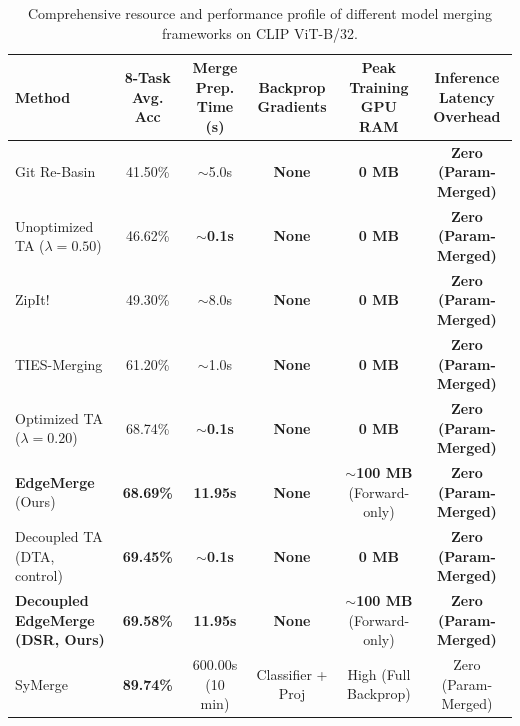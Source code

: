 \begin{table}[t]
\caption{Comprehensive resource and performance profile of different model merging frameworks on CLIP ViT-B/32.}
\label{tab:resource_profile}
\vskip 0.15in
\begin{center}
\begin{small}
\begin{sc}
\begin{tabular}{lccccc}
\toprule
Method & 8-Task Avg. Acc & Merge Prep. Time (s) & Backprop Gradients & Peak Training GPU RAM & Inference Latency Overhead \\
\midrule
Git Re-Basin \cite{ainsworth2023git} & 41.50\% & $\sim$5.0s & \textbf{None} & \textbf{0 MB} & \textbf{Zero (Param-Merged)} \\
Unoptimized TA ($\lambda = 0.50$) & 46.62\% & \textbf{$\sim$0.1s} & \textbf{None} & \textbf{0 MB} & \textbf{Zero (Param-Merged)} \\
ZipIt! \cite{stoica2023zipit} & 49.30\% & $\sim$8.0s & \textbf{None} & \textbf{0 MB} & \textbf{Zero (Param-Merged)} \\
TIES-Merging \cite{yadav2023resolving} & 61.20\% & $\sim$1.0s & \textbf{None} & \textbf{0 MB} & \textbf{Zero (Param-Merged)} \\
Optimized TA ($\lambda = 0.20$)  & 68.74\% & \textbf{$\sim$0.1s} & \textbf{None} & \textbf{0 MB} & \textbf{Zero (Param-Merged)} \\
\textbf{EdgeMerge} (Ours) & \textbf{68.69\%} & \textbf{11.95s}     & \textbf{None} & \textbf{$\sim$100 MB} (Forward-only) & \textbf{Zero (Param-Merged)} \\
Decoupled TA (DTA, control) & \textbf{69.45\%} & \textbf{$\sim$0.1s} & \textbf{None} & \textbf{0 MB} & \textbf{Zero (Param-Merged)} \\
\textbf{Decoupled EdgeMerge (DSR, Ours)} & \textbf{69.58\%} & \textbf{11.95s} & \textbf{None} & \textbf{$\sim$100 MB} (Forward-only) & \textbf{Zero (Param-Merged)} \\
SyMerge \cite{lu2026symerge} & \textbf{89.74\%} & 600.00s (10 min)    & Classifier + Proj & High (Full Backprop) & Zero (Param-Merged) \\
\bottomrule
\end{tabular}
\end{sc}
\end{small}
\end{center}
\vskip -0.1in
\end{table}

